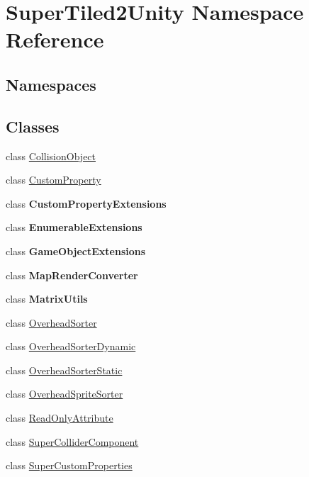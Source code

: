 \hypertarget{namespace_super_tiled2_unity}{}\section{Super\+Tiled2\+Unity Namespace Reference}
\label{namespace_super_tiled2_unity}
\subsection*{Namespaces}
\begin{DoxyCompactItemize}
\end{DoxyCompactItemize}
\subsection*{Classes}
\begin{DoxyCompactItemize}
\item 
class \mbox{\hyperlink{class_super_tiled2_unity_1_1_collision_object}{Collision\+Object}}
\item 
class \mbox{\hyperlink{class_super_tiled2_unity_1_1_custom_property}{Custom\+Property}}
\item 
class {\bfseries Custom\+Property\+Extensions}
\item 
class {\bfseries Enumerable\+Extensions}
\item 
class {\bfseries Game\+Object\+Extensions}
\item 
class {\bfseries Map\+Render\+Converter}
\item 
class {\bfseries Matrix\+Utils}
\item 
class \mbox{\hyperlink{class_super_tiled2_unity_1_1_overhead_sorter}{Overhead\+Sorter}}
\item 
class \mbox{\hyperlink{class_super_tiled2_unity_1_1_overhead_sorter_dynamic}{Overhead\+Sorter\+Dynamic}}
\item 
class \mbox{\hyperlink{class_super_tiled2_unity_1_1_overhead_sorter_static}{Overhead\+Sorter\+Static}}
\item 
class \mbox{\hyperlink{class_super_tiled2_unity_1_1_overhead_sprite_sorter}{Overhead\+Sprite\+Sorter}}
\item 
class \mbox{\hyperlink{class_super_tiled2_unity_1_1_read_only_attribute}{Read\+Only\+Attribute}}
\item 
class \mbox{\hyperlink{class_super_tiled2_unity_1_1_super_collider_component}{Super\+Collider\+Component}}
\item 
class \mbox{\hyperlink{class_super_tiled2_unity_1_1_super_custom_properties}{Super\+Custom\+Properties}}

\end{DoxyCompactItemize}
